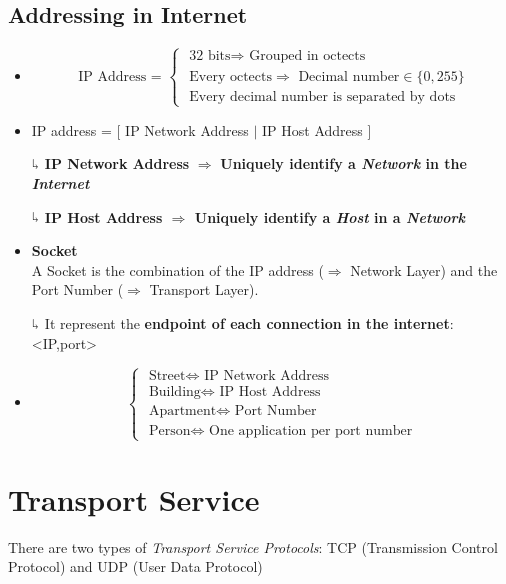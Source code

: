 \subsection{Addressing in Internet}
\begin{itemize}
\item \begin{equation}{\text{ IP Address = }}
\begin{cases}
\text{ 32 bits}\Rightarrow\text{ Grouped in octects}\\
\text{ Every octects}\Rightarrow\text{ Decimal number} \in \{0,255\}\\
\text{ Every decimal number is separated by dots}
\end{cases}
\end{equation} 
\item IP address = [ IP Network Address $\mid$ IP Host Address ]

$\curarr$ \textbf{IP Network Address} \textbf{$\Rightarrow$} \textbf{Uniquely identify a \emph{Network} in the \emph{Internet}}

$\curarr$ \textbf{ IP Host Address $\Rightarrow$ Uniquely identify a \emph{Host} in a \emph{Network}}
\item \begin{definition}{\textbf{Socket}\\}
A Socket is the combination of the IP address ($\Rightarrow$ Network Layer) and the Port Number ($\Rightarrow$ Transport Layer).

$\curarr$ It represent the \textbf{endpoint of each connection in the internet}: <IP,port>

\end{definition}
\item \begin{equation}
\begin{cases}
\text{ Street} \Longleftrightarrow \text{ IP Network Address}\\
\text{ Building} \Longleftrightarrow \text{ IP Host Address}\\
\text{ Apartment} \Longleftrightarrow \text{ Port Number}\\
\text{ Person} \Longleftrightarrow \text{ One application per port number}
\end{cases}
\end{equation}
\end{itemize}


\section{Transport Service}
There are two types of \emph{Transport Service Protocols}: TCP (Transmission Control Protocol) and UDP (User Data Protocol)

